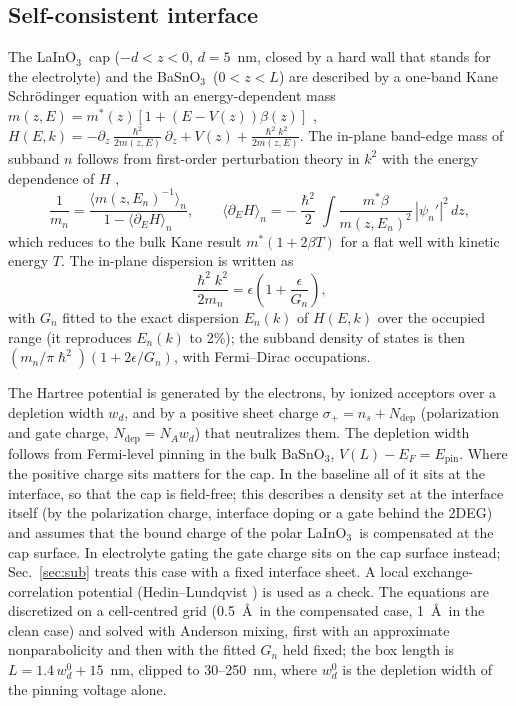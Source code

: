 \documentclass[11pt]{article}
\newcommand{\LIO}{\texorpdfstring{LaInO$_3$}{LaInO3}}
\newcommand{\BSO}{\texorpdfstring{BaSnO$_3$}{BaSnO3}}
\begin{document}
\subsection{Self-consistent interface}
The \LIO\ cap ($-d<z<0$, $d=5$~nm, closed by a hard wall that stands for the electrolyte) and the \BSO\ ($0<z<L$) are described by a one-band Kane Schr\"odinger equation with an energy-dependent mass $m(z,E)=m^*(z)[1+(E-V(z))\beta(z)]$ \cite{Nelson1987}, $H(E,k)=-\partial_z\frac{\hslash^2}{2m(z,E)}\partial_z+V(z)+\frac{\hslash^2k^2}{2m(z,E)}$. The in-plane band-edge mass of subband $n$ follows from first-order perturbation theory in $k^2$ with the energy dependence of $H$ \cite{Ekenberg1989},
\begin{equation}
\frac{1}{m_n}=\frac{\langle m(z,E_n)^{-1}\rangle_n}{1-\langle\partial_EH\rangle_n},\qquad \langle\partial_EH\rangle_n=-\frac{\hslash^2}{2}\int\frac{m^*\beta}{m(z,E_n)^2}\,|\psi_n'|^2\,dz,\label{eq:mass}
\end{equation}
which reduces to the bulk Kane result $m^*(1+2\beta T)$ for a flat well with kinetic energy $T$. The in-plane dispersion is written as
\begin{equation}
\frac{\hslash^2k^2}{2m_n}=\epsilon\left(1+\frac{\epsilon}{G_n}\right),\label{eq:disp}
\end{equation}
with $G_n$ fitted to the exact dispersion $E_n(k)$ of $H(E,k)$ over the occupied range (it reproduces $E_n(k)$ to 2\%); the subband density of states is then $(m_n/\pi\hslash^2)(1+2\epsilon/G_n)$, with Fermi--Dirac occupations.

The Hartree potential is generated by the electrons, by ionized acceptors over a depletion width $w_d$, and by a positive sheet charge $\sigma_+=n_s+N_\mathrm{dep}$ (polarization and gate charge, $N_\mathrm{dep}=N_Aw_d$) that neutralizes them. The depletion width follows from Fermi-level pinning in the bulk \BSO, $V(L)-E_F=E_\mathrm{pin}$. Where the positive charge sits matters for the cap. In the baseline all of it sits at the interface, so that the cap is field-free; this describes a density set at the interface itself (by the polarization charge, interface doping or a gate behind the 2DEG) and assumes that the bound charge of the polar \LIO\ is compensated at the cap surface. In electrolyte gating the gate charge sits on the cap surface instead; Sec.~\ref{sec:sub} treats this case with a fixed interface sheet. A local exchange-correlation potential (Hedin--Lundqvist \cite{HedinLundqvist1971}) is used as a check. The equations are discretized on a cell-centred grid (0.5~\AA\ in the compensated case, 1~\AA\ in the clean case) and solved with Anderson mixing, first with an approximate nonparabolicity and then with the fitted $G_n$ held fixed; the box length is $L=1.4\,w_d^{0}+15$~nm, clipped to 30--250~nm, where $w_d^0$ is the depletion width of the pinning voltage alone.
\end{document}
